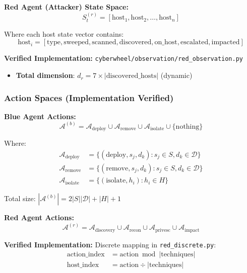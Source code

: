 \documentclass[11pt]{article}
\begin{document}
\textbf{Red Agent (Attacker) State Space:}
\begin{equation}
S_t^{(r)} = [\text{host}_1, \text{host}_2, \ldots, \text{host}_n]
\end{equation}

Where each host state vector contains:
\begin{equation}
\text{host}_i = [\text{type}, \text{sweeped}, \text{scanned}, \text{discovered}, \text{on\_host}, \text{escalated}, \text{impacted}]
\end{equation}

\textbf{Verified Implementation:} \texttt{cyberwheel/observation/red\_observation.py}
\begin{itemize}
\item \textbf{Total dimension}: $d_r = 7 \times |\text{discovered\_hosts}|$ (dynamic)
\end{itemize}

\subsubsection{Action Spaces (Implementation Verified)}

\textbf{Blue Agent Actions:}
\begin{equation}
\mathcal{A}^{(b)} = \mathcal{A}_{\text{deploy}} \cup \mathcal{A}_{\text{remove}} \cup \mathcal{A}_{\text{isolate}} \cup \{\text{nothing}\}
\end{equation}

Where:
\begin{align}
\mathcal{A}_{\text{deploy}} &= \{(\text{deploy}, s_j, d_k) : s_j \in S, d_k \in \mathcal{D}\} \\
\mathcal{A}_{\text{remove}} &= \{(\text{remove}, s_j, d_k) : s_j \in S, d_k \in \mathcal{D}\} \\
\mathcal{A}_{\text{isolate}} &= \{(\text{isolate}, h_i) : h_i \in H\}
\end{align}

Total size: $|\mathcal{A}^{(b)}| = 2|S||\mathcal{D}| + |H| + 1$

\textbf{Red Agent Actions:}
\begin{equation}
\mathcal{A}^{(r)} = \mathcal{A}_{\text{discovery}} \cup \mathcal{A}_{\text{recon}} \cup \mathcal{A}_{\text{privesc}} \cup \mathcal{A}_{\text{impact}}
\end{equation}

\textbf{Verified Implementation:} Discrete mapping in \texttt{red\_discrete.py}:
\begin{align}
\text{action\_index} &= \text{action} \bmod |\text{techniques}| \\
\text{host\_index} &= \text{action} \div |\text{techniques}|
\end{align}
\end{document}

